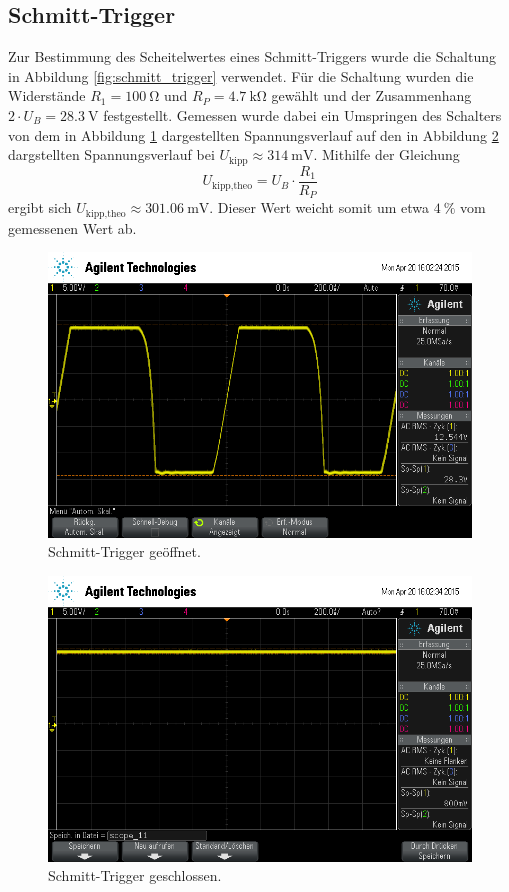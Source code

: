 \subsection{Schmitt-Trigger} %
\label{sub:schmitt_trigger}

Zur Bestimmung des Scheitelwertes eines Schmitt-Triggers wurde die Schaltung in Abbildung \ref{fig:schmitt_trigger} verwendet.
Für die Schaltung wurden die Widerstände $R_1 = \SI{100}{\ohm}$ und $R_P = \SI{4.7}{\kilo\ohm}$ gewählt und der Zusammenhang $2 \cdot U_B = \SI{28.3}{\volt}$ festgestellt.
Gemessen wurde dabei ein Umspringen des Schalters von dem in Abbildung \ref{fig:schmitt_offen} dargestellten Spannungsverlauf auf den in Abbildung \ref{fig:schmitt_geschlossen} dargstellten Spannungsverlauf bei $U_\text{kipp} \approx \SI{314}{\milli\volt}$.
Mithilfe der Gleichung
\begin{equation*}
    U_\text{kipp,theo} = U_B \cdot \frac{R_1}{R_P} 
\end{equation*}
ergibt sich $U_\text{kipp,theo} \approx \SI{301.06}{\milli\volt}$.
Dieser Wert weicht somit um etwa $\SI{4}{\percent}$ vom gemessenen Wert ab.

\begin{figure}[!h]
    \centering
    \includegraphics[width=0.8\linewidth]{data/scope_10.png}
    \caption{Schmitt-Trigger geöffnet.}
    \label{fig:schmitt_offen}
\end{figure}

\begin{figure}[!h]
    \centering
    \includegraphics[width=0.8\linewidth]{data/scope_11.png}
    \caption{Schmitt-Trigger geschlossen.}
    \label{fig:schmitt_geschlossen}
\end{figure}

